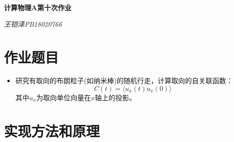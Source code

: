 \documentclass[UTF8]{ctexart}
\begin{document}
	\centering\textbf{\LARGE{计算物理A第十次作业}}
	
	
	\textit{王铠泽\qquad PB18020766}
	
		
	\section{作业题目}
	
	\begin{itemize}
		\item 研究有取向的布朗粒子(如纳米棒)的随机行走，计算取向的自关联函数：
		$$C(t)=\langle u_x(t)u_x(0)\rangle$$
		其中$u_x$为取向单位向量在$x$轴上的投影。
		
	\end{itemize}

	\section{实现方法和原理}
	
\end{document}
